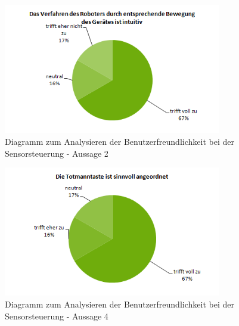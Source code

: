 \begin{figure}[H]
	\centering
		\includegraphics[width=0.85\textwidth]{03_Grafiken/Anhang/UsabilityDiagramme/Aufgabenteil4Aussage2.png}
	\caption[Diagramm zum Analysieren der Benutzerfreundlichkeit bei der Sensorsteuerung - Aussage 1]{Diagramm zum Analysieren der Benutzerfreundlichkeit bei der Sensorsteuerung - Aussage 2}
	\label{fig:Aufgabenteil4Aussage2}
\end{figure}
\begin{figure}[H]
	\centering
		\includegraphics[width=0.85\textwidth]{03_Grafiken/Anhang/UsabilityDiagramme/Aufgabenteil4Aussage4.png}
	\caption[Diagramm zum Analysieren der Benutzerfreundlichkeit bei der Sensorsteuerung - Aussage 4]{Diagramm zum Analysieren der Benutzerfreundlichkeit bei der Sensorsteuerung - Aussage 4}
	\label{fig:Aufgabenteil4Aussage4}
\end{figure}
